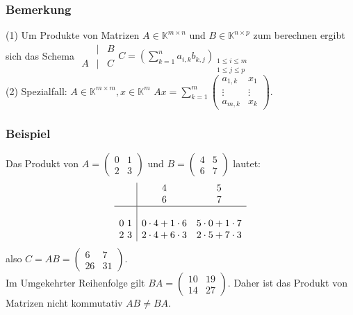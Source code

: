 \subsubsection{Bemerkung}
(1) Um Produkte von Matrizen $A\in \mathbb{K}^{m\times n}$ und $B\in \mathbb{K}^{n\times p}$ zum berechnen ergibt sich das Schema $\begin{array}{ccc} & | & B\\A & | & C\end{array} C=(\sum^{n}_{k=1} a_{i,k}b_{k,j})_{\substack{1\leq i\leq m\\1\leq j\leq p}}$\\
(2) Spezialfall: $A\in \mathbb{K}^{m\times m},x\in \mathbb{K}^m$ $Ax=\sum^{m}_{k=1}\left(\begin{array}{cc}a_{1,k}&x_{1}\\\vdots & \vdots \\ a_{m,k} & x_k\end{array}\right)$.
\subsubsection{Beispiel}
Das Produkt von $A=\left(\begin{array}{cc}0 & 1\\ 2 & 3\end{array}\right)$ und $B=\left(\begin{array}{cc}4 & 5 \\ 6 & 7\end{array}\right)$ lautet:
\[\begin{array}{c|cc} & \begin{matrix}4\\ 6\end{matrix} & \begin{matrix} 5\\ 7\end{matrix} \\ \hline \\0\ 1 & 0\cdot 4+1\cdot 6 & 5\cdot 0 + 1\cdot 7 \\ 2\ 3 & 2\cdot 4+6\cdot 3 & 2\cdot 5+7\cdot 3\end{array}\] also $C=AB=\left(\begin{array}{cc}6 & 7 \\ 26 & 31\end{array}\right)$.\\
Im Umgekehrter Reihenfolge gilt $BA=\left(\begin{array}{cc} 10 & 19 \\ 14 & 27\end{array}\right)$.  Daher ist das Produkt von Matrizen nicht kommutativ $AB\not= BA$.
